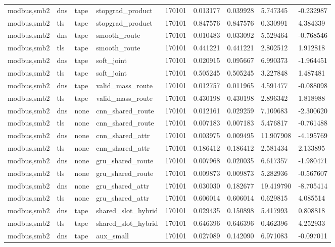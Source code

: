 \begin{tabular}{lllllllll}
modbus,smb2 & dns & tape & stopgrad\_product & 170101 & 0.013177 & 0.039928 & 5.747345 & -0.232987 \\
modbus,smb2 & tls & tape & stopgrad\_product & 170101 & 0.847576 & 0.847576 & 0.330991 & 4.384339 \\
modbus,smb2 & dns & tape & smooth\_route & 170101 & 0.010483 & 0.033092 & 5.529464 & -0.768546 \\
modbus,smb2 & tls & tape & smooth\_route & 170101 & 0.441221 & 0.441221 & 2.802512 & 1.912818 \\
modbus,smb2 & dns & tape & soft\_joint & 170101 & 0.020915 & 0.095667 & 6.990373 & -1.964451 \\
modbus,smb2 & tls & tape & soft\_joint & 170101 & 0.505245 & 0.505245 & 3.227848 & 1.487481 \\
modbus,smb2 & dns & tape & valid\_mass\_route & 170101 & 0.012757 & 0.011965 & 4.591477 & -0.088098 \\
modbus,smb2 & tls & tape & valid\_mass\_route & 170101 & 0.430198 & 0.430198 & 2.896342 & 1.818988 \\
modbus,smb2 & dns & none & cnn\_shared\_route & 170101 & 0.012161 & 0.029259 & 7.109683 & -2.300620 \\
modbus,smb2 & tls & none & cnn\_shared\_route & 170101 & 0.007183 & 0.007183 & 5.476817 & -0.761488 \\
modbus,smb2 & dns & none & cnn\_shared\_attr & 170101 & 0.003975 & 0.009495 & 11.907908 & -4.195769 \\
modbus,smb2 & tls & none & cnn\_shared\_attr & 170101 & 0.186412 & 0.186412 & 2.581434 & 2.133895 \\
modbus,smb2 & dns & none & gru\_shared\_route & 170101 & 0.007968 & 0.020035 & 6.617357 & -1.980471 \\
modbus,smb2 & tls & none & gru\_shared\_route & 170101 & 0.009873 & 0.009873 & 5.282936 & -0.567607 \\
modbus,smb2 & dns & none & gru\_shared\_attr & 170101 & 0.030030 & 0.182677 & 19.419790 & -8.705414 \\
modbus,smb2 & tls & none & gru\_shared\_attr & 170101 & 0.606014 & 0.606014 & 0.629815 & 4.085514 \\
modbus,smb2 & dns & tape & shared\_slot\_hybrid & 170101 & 0.029435 & 0.150898 & 5.417993 & 0.808818 \\
modbus,smb2 & tls & tape & shared\_slot\_hybrid & 170101 & 0.646396 & 0.646396 & 0.462396 & 4.252933 \\
modbus,smb2 & dns & tape & aux\_small & 170101 & 0.027089 & 0.142090 & 6.971083 & -0.097011 \\

\end{tabular}
